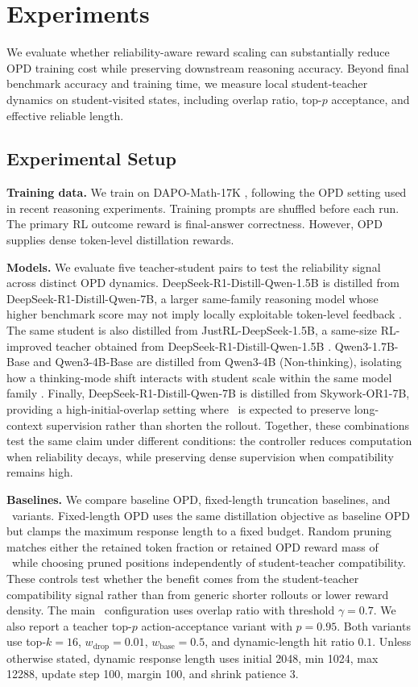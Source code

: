 \section{Experiments}
\label{sec:experiments}

We evaluate whether reliability-aware reward scaling can substantially reduce OPD training cost while preserving downstream reasoning accuracy.
Beyond final benchmark accuracy and training time, we measure local student-teacher dynamics on student-visited states, including overlap ratio, top-$p$ acceptance, and effective reliable length.

\subsection{Experimental Setup}

\noindent\textbf{Training data.}
We train on DAPO-Math-17K \citep{yu2025dapo}, following the OPD setting used in recent reasoning experiments.
Training prompts are shuffled before each run.
The primary RL outcome reward is final-answer correctness. However, OPD supplies dense token-level distillation rewards.

\noindent\textbf{Models.}
We evaluate five teacher-student pairs to test the reliability signal across distinct OPD dynamics.
DeepSeek-R1-Distill-Qwen-1.5B is distilled from DeepSeek-R1-Distill-Qwen-7B, a larger same-family reasoning model whose higher benchmark score may not imply locally exploitable token-level feedback \citep{guo2025deepseek}.
The same student is also distilled from JustRL-DeepSeek-1.5B, a same-size RL-improved teacher obtained from DeepSeek-R1-Distill-Qwen-1.5B \citep{he2025justrl}.
Qwen3-1.7B-Base and Qwen3-4B-Base are distilled from Qwen3-4B (Non-thinking), isolating how a thinking-mode shift interacts with student scale within the same model family \citep{yang2025qwen3}.
Finally, DeepSeek-R1-Distill-Qwen-7B is distilled from Skywork-OR1-7B, providing a high-initial-overlap setting where \method~is expected to preserve long-context supervision rather than shorten the rollout.
Together, these combinations test the same claim under different conditions: the controller reduces computation when reliability decays, while preserving dense supervision when compatibility remains high.

\noindent\textbf{Baselines.}
We compare baseline OPD, fixed-length truncation baselines, and \method~variants.
Fixed-length OPD uses the same distillation objective as baseline OPD but clamps the maximum response length to a fixed budget.
Random pruning matches either the retained token fraction or retained OPD reward mass of \method~while choosing pruned positions independently of student-teacher compatibility.
These controls test whether the benefit comes from the student-teacher compatibility signal rather than from generic shorter rollouts or lower reward density.
The main \method~configuration uses overlap ratio with threshold $\gamma=0.7$.
We also report a teacher top-$p$ action-acceptance variant with $p=0.95$. Both variants use top-$k=16$, $w_{\mathrm{drop}}=0.01$, $w_{\mathrm{base}}=0.5$, and dynamic-length hit ratio $0.1$.
Unless otherwise stated, dynamic response length uses initial 2048, min 1024, max 12288, update step 100, margin 100, and shrink patience 3.

